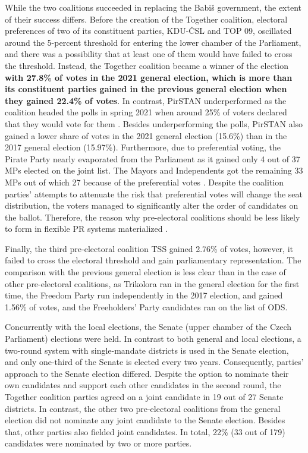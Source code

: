 \documentclass[]{interact}
\theoremstyle{plain}%
\theoremstyle{definition}
\theoremstyle{remark}
\begin{document}
While the two coalitions succeeded in replacing the Babiš government, the extent of their success differs. Before the creation of the Together coalition, electoral preferences of two of its constituent parties, KDU-ČSL and TOP 09, oscillated around the 5-percent threshold for entering the lower chamber of the Parliament, and there was a possibility that at least one of them would have failed to cross the threshold. Instead, the Together coalition became a winner of the election \textbf{with 27.8\% of votes in the 2021 general election, which is more than its constituent parties gained in the previous general election when they gained 22.4\% of votes}. 
In contrast, PirSTAN underperformed as the coalition headed the polls in spring 2021 when around 25\% of voters declared that they would vote for them \citep[see e.g.][]{linek2022}. Besides underperforming the polls, PirSTAN also gained a lower share of votes in the 2021 general election (15.6\%) than in the 2017 general election (15.97\%).
Furthermore, due to preferential voting, the Pirate Party nearly evaporated from the Parliament as it gained only 4 out of 37 MPs elected on the joint list. The Mayors and Independents got the remaining 33 MPs out of which 27 because of the preferential votes \citep[15]{maskarinec2022}. Despite the coalition parties' attempts to attenuate the risk that preferential votes will change the seat distribution, the voters managed to significantly alter the order of candidates on the ballot. Therefore, the reason why pre-electoral coalitions should be less likely to form in flexible PR systems materialized \citep{ibenskas2016}. 

Finally, the third pre-electoral coalition TSS gained 2.76\% of votes, however, it failed to cross the electoral threshold and gain parliamentary representation. The comparison with the previous general election is less clear than in the case of other pre-electoral coalitions, as Trikolora ran in the general election for the first time, the Freedom Party run independently in the 2017 election, and gained 1.56\% of votes, and the Freeholders' Party candidates ran on the list of ODS.

Concurrently with the local elections, the Senate (upper chamber of the Czech Parliament) elections were held. In contrast to both general and local elections, a two-round system with single-mandate districts is used in the Senate election, and only one-third of the Senate is elected every two years. Consequently, parties' approach to the Senate election differed. 
Despite the option to nominate their own candidates and support each other candidates in the second round, the Together coalition parties agreed on a joint candidate in 19 out of 27 Senate districts. In contrast, the other two pre-electoral coalitions from the general election did not nominate any joint candidate to the Senate election. Besides that, other parties also fielded joint candidates. In total, 22\% (33 out of 179) candidates were nominated by two or more parties.
\end{document}

